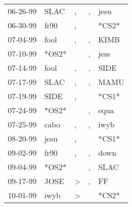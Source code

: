 \begin{supertabular}{p{0.07\textwidth}p{0.06\textwidth}p{0.02\textwidth}p{0.02\textwidth}p{0.06\textwidth}}
          06-26-99\textsuperscript{} &           SLAC\textsuperscript{} &                , &                , &           jesu\textsuperscript{} \\
          06-30-99\textsuperscript{} &           fr90\textsuperscript{} &                , &                  &                            *CS2* \\
          07-04-99\textsuperscript{} &           fool\textsuperscript{} &                , &                , &           KIMB\textsuperscript{} \\
          07-10-99\textsuperscript{} &                            *OS2* &                  &                , &           jess\textsuperscript{} \\
          07-14-99\textsuperscript{} &           fool\textsuperscript{} &                , &                , &           SIDE\textsuperscript{} \\
          07-17-99\textsuperscript{} &           SLAC\textsuperscript{} &                , &                , &           MAMU\textsuperscript{} \\
          07-19-99\textsuperscript{} &           SIDE\textsuperscript{} &                , &                  &                            *CS1* \\
          07-24-99\textsuperscript{} &                            *OS2* &                  &                , &           equa\textsuperscript{} \\
          07-25-99\textsuperscript{} &           cabo\textsuperscript{} &                , &                , &           iwyb\textsuperscript{} \\
          08-20-99\textsuperscript{} &           jesu\textsuperscript{} &                , &                  &                            *CS1* \\
          09-02-99\textsuperscript{} &           fr90\textsuperscript{} &                , &                , &           down\textsuperscript{} \\
          09-04-99\textsuperscript{} &                            *OS2* &                  &                , &           SLAC\textsuperscript{} \\
          09-17-99\textsuperscript{} &           JOSE\textsuperscript{} &     \textgreater &                , &             FF\textsuperscript{} \\
          10-01-99\textsuperscript{} &           iwyb\textsuperscript{} &     \textgreater &                  &                            *CS2* \\

\end{supertabular}
